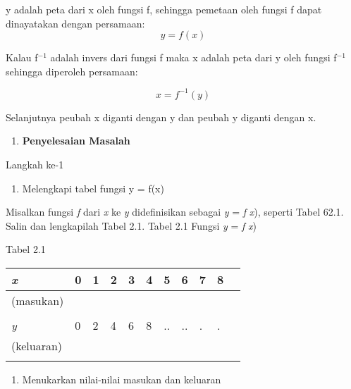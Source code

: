\documentclass[11pt,fleqn]{book} %
\begin{document}
\begin{myEnumerate}
\begin{itemize}
\noindent 

\noindent 

y adalah peta dari x oleh fungsi f, sehingga pemetaan oleh fungsi f dapat dinayatakan dengan persamaan:
\[y=f(x)\] 


Kalau f${}^{-1}$ adalah invers dari fungsi f maka x adalah peta dari y oleh fungsi f${}^{-1}$ sehingga diperoleh persamaan:

\noindent 
\[x=f^{-1} (y)\] 


Selanjutnya peubah x diganti dengan y dan peubah y diganti dengan x. \textbf{}

\noindent 

\begin{enumerate}
\item  \textbf{Penyelesaian Masalah}
\end{enumerate}

\noindent Langkah ke-1

\begin{enumerate}
\item  Melengkapi tabel fungsi y = f(x)
\end{enumerate}

\noindent Misalkan fungsi \textit{f} dari \textit{x} ke \textit{y} didefinisikan sebagai \textit{y} = \textit{f} \textit{x}), seperti Tabel 62.1. Salin dan lengkapilah Tabel 2.1. Tabel 2.1\textbf{ }Fungsi\textbf{ }\textit{y}\textbf{ }=\textbf{ }\textit{f}\textbf{ }\textit{x})

\noindent 

\noindent Tabel 2.1

\noindent 

\begin{tabular}{|p{0.6in}|p{0.4in}|p{0.3in}|p{0.2in}|p{0.2in}|p{0.2in}|p{0.2in}|p{0.2in}|p{0.2in}|p{0.2in}|p{0.2in}|} \hline 
\textit{x}  & 0 & 1 & 2 & 3 & 4 & 5 & 6 & 7 & 8 \\ \hline 
 (masukan) &  &  &  &  &  &  &  &  &  \\ \hline 
 &  &  &  &  &  &  &  &  &  &  \\ \hline 
\textit{y}  & 0 & 2 & 4 & 6 & 8 & .. & .. & . & . \\ \hline 
 (keluaran) &  &  &  &  &  &  &  &  &  \\ \hline 
 &  &  &  &  &  &  &  &  &  &  \\ \hline 
\end{tabular}



\begin{enumerate}
\item  Menukarkan nilai-nilai masukan dan keluaran
\end{enumerate}


\end{itemize}
\end{myEnumerate}
\end{document}
